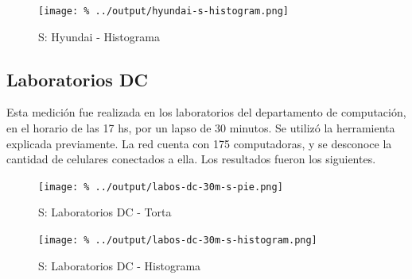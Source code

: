 \documentclass[final,narroweqnarray,inline]{ieee}
\begin{document}
    \begin{figure}[ht]\begin{center}
      \texttt{[image: \%
      ../output/hyundai-s-histogram.png]}
      \caption{S: Hyundai - Histograma}
      \label{hyundai-s-histogram}
    \end{center}\end{figure}

  \subsection{Laboratorios DC}

    Esta medición fue realizada en los laboratorios del departamento de
    computación, en el horario de las 17 hs, por un lapso de 30 minutos.
    Se utilizó la herramienta explicada previamente. La red cuenta con 175
    computadoras, y se desconoce la cantidad de celulares conectados a ella.
    Los resultados fueron los siguientes.
   
    \begin{figure}[H]\begin{center}
      \texttt{[image: \%
      ../output/labos-dc-30m-s-pie.png]}
      \vspace{-3em}
      \caption{S: Laboratorios DC - Torta}
      \label{labos-dc-30m-s-pie}
    \end{center}\end{figure}

    \begin{figure}[H]\begin{center}
      \texttt{[image: \%
      ../output/labos-dc-30m-s-histogram.png]}
      \caption{S: Laboratorios DC - Histograma}
      \label{labos-dc-30m-s-histogram}
    \end{center}\end{figure}
\end{document}
